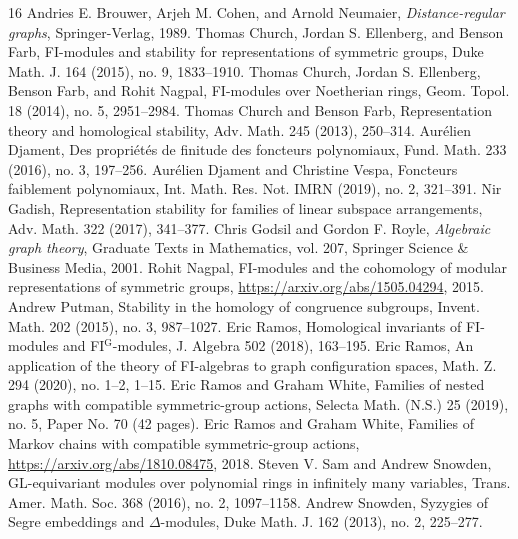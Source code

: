 \begin{thebibliography}{16}
 Andries E. Brouwer, Arjeh M. Cohen, and Arnold Neumaier, \emph{Distance-regular graphs}, Springer-Verlag, 1989.
 Thomas Church, Jordan S. Ellenberg, and Benson Farb, FI-modules and stability for representations of symmetric groups, Duke Math. J. 164 (2015), no. 9, 1833--1910.
 Thomas Church, Jordan S. Ellenberg, Benson Farb, and Rohit Nagpal, FI-modules over Noetherian rings, Geom. Topol. 18 (2014), no. 5, 2951--2984.
 Thomas Church and Benson Farb, Representation theory and homological stability, Adv. Math. 245 (2013), 250--314.
 Aurélien Djament, Des propriétés de finitude des foncteurs polynomiaux, Fund. Math. 233 (2016), no. 3, 197--256.
 Aurélien Djament and Christine Vespa, Foncteurs faiblement polynomiaux, Int. Math. Res. Not. IMRN (2019), no. 2, 321--391.
 Nir Gadish, Representation stability for families of linear subspace arrangements, Adv. Math. 322 (2017), 341--377.
 Chris Godsil and Gordon F. Royle, \emph{Algebraic graph theory}, Graduate Texts in Mathematics, vol. 207, Springer Science \& Business Media, 2001.
 Rohit Nagpal, FI-modules and the cohomology of modular representations of symmetric groups, \url{https://arxiv.org/abs/1505.04294}, 2015.
 Andrew Putman, Stability in the homology of congruence subgroups, Invent. Math. 202 (2015), no. 3, 987--1027.
 Eric Ramos, Homological invariants of FI-modules and FI$^\mathrm{G}$-modules, J. Algebra 502 (2018), 163--195.
 Eric Ramos, An application of the theory of FI-algebras to graph configuration spaces, Math. Z. 294 (2020), no. 1--2, 1--15.
 Eric Ramos and Graham White, Families of nested graphs with compatible symmetric-group actions, Selecta Math. (N.S.) 25 (2019), no. 5, Paper No. 70 (42 pages).
 Eric Ramos and Graham White, Families of Markov chains with compatible symmetric-group actions, \url{https://arxiv.org/abs/1810.08475}, 2018.
 Steven V. Sam and Andrew Snowden, GL-equivariant modules over polynomial rings in infinitely many variables, Trans. Amer. Math. Soc. 368 (2016), no. 2, 1097--1158.
 Andrew Snowden, Syzygies of Segre embeddings and $\Delta$-modules, Duke Math. J. 162 (2013), no. 2, 225--277.
\end{thebibliography}

